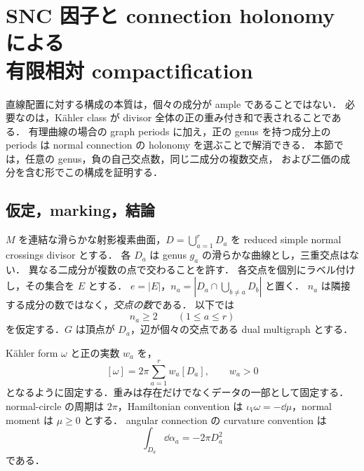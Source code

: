 \section[SNC 因子と connection holonomy による有限相対 compactification]{SNC 因子と connection holonomy による\\有限相対 compactification}
\label{snc:section}

直線配置に対する構成の本質は，個々の成分が ample であることではない．
必要なのは，Kähler class が divisor 全体の正の重み付き和で表されることである．
有理曲線の場合の graph periods に加え，正の genus を持つ成分上の periods は
normal connection の holonomy を選ぶことで解消できる．
本節では，任意の genus，負の自己交点数，同じ二成分の複数交点，
および二価の成分を含む形でこの構成を証明する．

\subsection{仮定，marking，結論}

$M$ を連結な滑らかな射影複素曲面，$D=\bigcup_{a=1}^{r}D_a$ を
reduced simple normal crossings divisor とする．
各 $D_a$ は genus $g_a$ の滑らかな曲線とし，三重交点はない．
異なる二成分が複数の点で交わることを許す．
各交点を個別にラベル付けし，その集合を $E$ とする．
$e=|E|$，$n_a=|D_a\cap\bigcup_{b\ne a}D_b|$ と置く．
$n_a$ は隣接する成分の数ではなく，\emph{交点の数}である．
以下では
\begin{equation}\label{snc:valence}
 n_a\geq2\qquad(1\leq a\leq r)
\end{equation}
を仮定する．$G$ は頂点が $D_a$，辺が個々の交点である dual multigraph とする．

Kähler form $\omega$ と正の実数 $w_a$ を，
\begin{equation}\label{snc:positive-class}
 [\omega]=2\pi\sum_{a=1}^{r}w_a[D_a],\qquad w_a>0
\end{equation}
となるように固定する．重みは存在だけでなくデータの一部として固定する．
normal-circle の周期は $2\pi$，Hamiltonian convention は
$\iota_V\omega=-\dd\mu$，normal moment は $\mu\geq0$ とする．
angular connection の curvature convention は
\begin{equation}\label{snc:curvature-convention}
 \int_{D_a}\dd\alpha_a=-2\pi D_a^2
\end{equation}
である．

